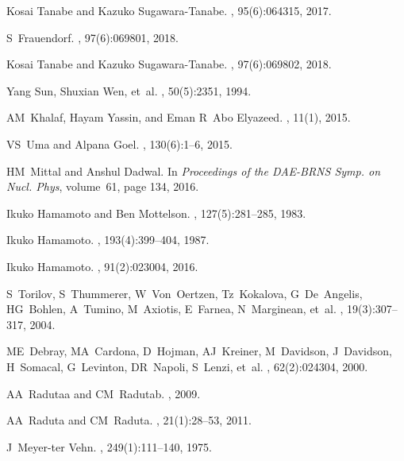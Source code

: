 \documentclass[myclassdoc,debug]{rjparticle}
\begin{document}
\begin{thebibliography}{99}
Kosai Tanabe and Kazuko Sugawara-Tanabe.
, 95(6):064315, 2017.

S~Frauendorf.
, 97(6):069801, 2018.

Kosai Tanabe and Kazuko Sugawara-Tanabe.
, 97(6):069802, 2018.

Yang Sun, Shuxian Wen, et~al.
, 50(5):2351, 1994.

AM~Khalaf, Hayam Yassin, and Eman R~Abo Elyazeed.
, 11(1), 2015.

VS~Uma and Alpana Goel.
, 130(6):1--6, 2015.

HM~Mittal and Anshul Dadwal.
\newblock In {\em Proceedings of the DAE-BRNS Symp. on Nucl. Phys}, volume~61,
  page 134, 2016.

Ikuko Hamamoto and Ben Mottelson.
, 127(5):281--285, 1983.

Ikuko Hamamoto.
, 193(4):399--404, 1987.

Ikuko Hamamoto.
, 91(2):023004, 2016.

S~Torilov, S~Thummerer, W~Von~Oertzen, Tz~Kokalova, G~De~Angelis, HG~Bohlen,
  A~Tumino, M~Axiotis, E~Farnea, N~Marginean, et~al.
,
  19(3):307--317, 2004.

ME~Debray, MA~Cardona, D~Hojman, AJ~Kreiner, M~Davidson, J~Davidson, H~Somacal,
  G~Levinton, DR~Napoli, S~Lenzi, et~al.
, 62(2):024304, 2000.

AA~Radutaa and CM~Radutab.
, 2009.

AA~Raduta and CM~Raduta.
, 21(1):28--53,
  2011.

J~Meyer-ter Vehn.
, 249(1):111--140, 1975.


\end{thebibliography}
\end{document}
